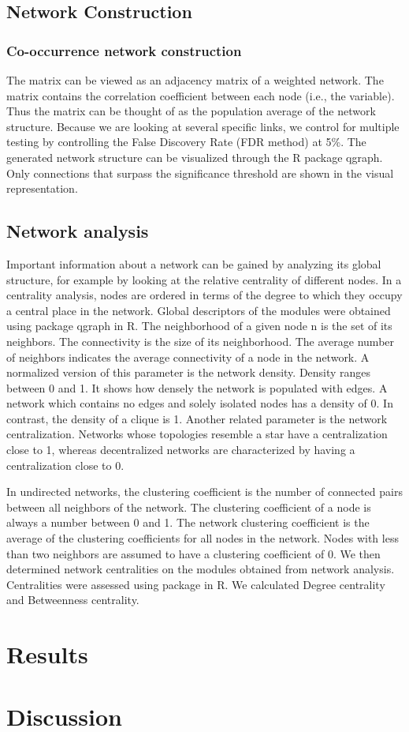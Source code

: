 \documentclass[a4paper]{article}
\begin{document}
\subsection*{Network Construction}
\subsubsection*{Co-occurrence network construction}
The matrix can be viewed as an adjacency matrix of a weighted network. The matrix contains the correlation coefficient between each node (i.e., the variable). Thus the matrix can be thought of as the population average of the network structure. Because we are looking at several specific links, we control for multiple testing by controlling the False Discovery Rate (FDR method) at 5\%. The generated network structure can be visualized through the R package qgraph. Only connections that surpass the significance threshold are shown in the visual representation. %

\subsection*{Network analysis}
Important information about a network can be gained by analyzing its global structure, for example by looking at the relative centrality of different nodes. In a centrality analysis, nodes are ordered in terms of the degree to which they occupy a central place in the network. Global descriptors of the modules were obtained using package qgraph in R. The neighborhood of a given node n is the set of its neighbors. The connectivity is the size of its neighborhood. The average number of neighbors indicates the average connectivity of a node in the network. A normalized version of this parameter is the network density. Density ranges between 0 and 1. It shows how densely the network is populated with edges. A network which contains no edges and solely isolated nodes has a density of 0. In contrast, the density of a clique is 1. Another related parameter is the network centralization. Networks whose topologies resemble a star have a centralization close to 1, whereas decentralized networks are characterized by having a centralization close to 0.

In undirected networks, the clustering coefficient is the number of connected pairs between all neighbors of the network. The clustering coefficient of a node is always a number between 0 and 1. The network clustering coefficient is the average of the clustering coefficients for all nodes in the network. Nodes with less than two neighbors are assumed to have a clustering coefficient of 0. We then determined network centralities on the modules obtained from network analysis. Centralities were assessed using package in R. We calculated Degree centrality and Betweenness centrality.


\section*{Results}

\section*{Discussion}


\end{document}
